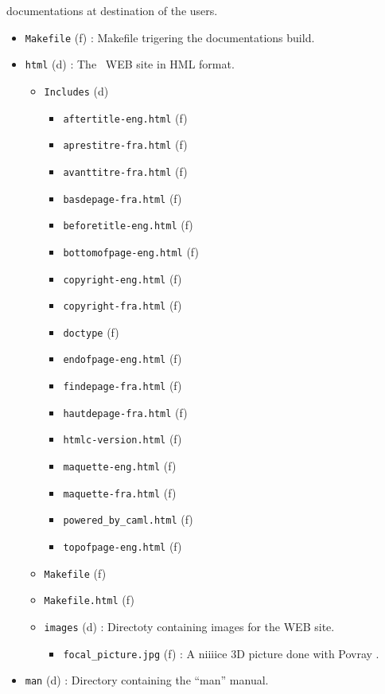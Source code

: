 \begin{itemize}
  documentations at destination of the users.
  \begin{itemize}
  \item {\tt Makefile} (f) : Makefile trigering the documentations
    build.
  \item {\tt html} (d) : The \focalize\ WEB site in HML format.
    \begin{itemize}
    \item {\tt Includes} (d)
      \begin{itemize}
      \item {\tt aftertitle-eng.html} (f)
      \item {\tt aprestitre-fra.html} (f)
      \item {\tt avanttitre-fra.html} (f)
      \item {\tt basdepage-fra.html} (f)
      \item {\tt beforetitle-eng.html} (f)
      \item {\tt bottomofpage-eng.html} (f)
      \item {\tt copyright-eng.html} (f)
      \item {\tt copyright-fra.html} (f)
      \item {\tt doctype} (f)
      \item {\tt endofpage-eng.html} (f)
      \item {\tt findepage-fra.html} (f)
      \item {\tt hautdepage-fra.html} (f)
      \item {\tt htmlc-version.html} (f)
      \item {\tt maquette-eng.html} (f)
      \item {\tt maquette-fra.html} (f)
      \item {\tt powered\_by\_caml.html} (f)
      \item {\tt topofpage-eng.html} (f)
      \end{itemize}
    \item {\tt Makefile} (f)
    \item {\tt Makefile.html} (f)
    \item {\tt images} (d) : Directoty containing images for the WEB
      site.
      \begin{itemize}
      \item {\tt focal\_picture.jpg} (f) : A niiiice 3D picture done with
        Povray \smiley.
      \end{itemize}
    \end{itemize}
  \item {\tt man} (d) : Directory containing the ``man'' manual.

\end{itemize}
\end{itemize}
